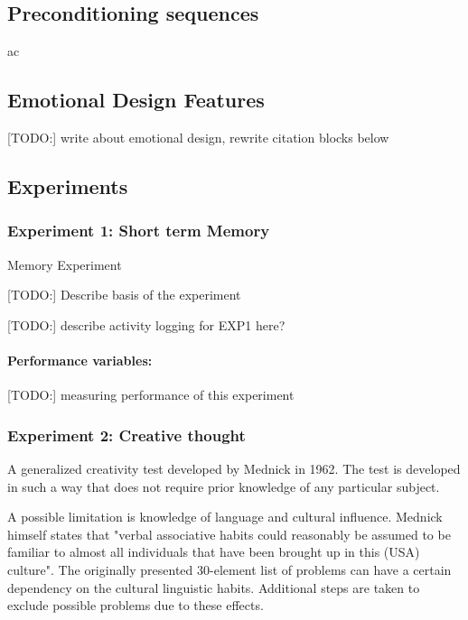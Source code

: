 	\subsection{Preconditioning sequences} \label{preconditioning}
	
	
	
ac	\subsection{Emotional Design Features}
	
	[TODO:] write about emotional design, rewrite citation blocks below
	
	
	
	\subsection{Experiments}

		\subsubsection{Experiment 1: Short term Memory} \label{sec:memory}
		
		Memory Experiment 
		
		[TODO:] Describe basis of the experiment
		
		[TODO:] describe activity logging for EXP1 here?
		
		\paragraph{Performance variables:} \label{sec:memory-parameters}
		
				[TODO:] measuring performance of this experiment
		
		\subsubsection{Experiment 2: Creative thought} \label{sec:creativity}
		
		A generalized creativity test developed by Mednick \cite{Mednick1962} in 1962. The test is developed in such a way that does not require prior knowledge of any particular subject. 
		
		A possible limitation is knowledge of language and cultural influence. Mednick himself states that "verbal associative habits could reasonably be assumed to be familiar to almost all individuals that have been brought up in this (USA) culture". The originally presented 30-element list of problems can have a certain dependency on the cultural linguistic habits. Additional steps are taken to exclude possible problems due to these effects. \
		
